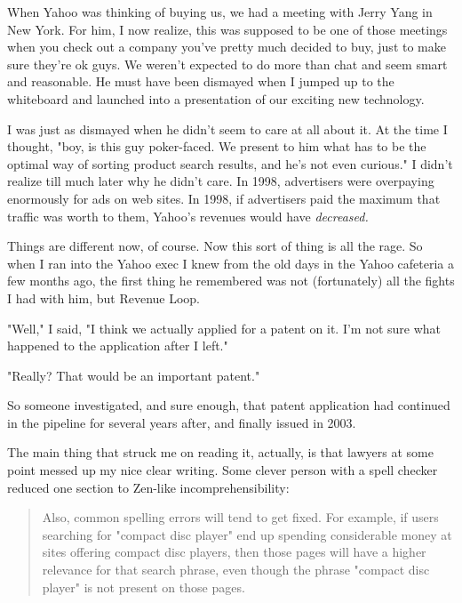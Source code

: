 When
                  Yahoo was thinking of buying us, we had a meeting with Jerry
                  Yang in New York. For him, I now realize, this was supposed to
                  be one of those meetings when you check out a company you've
                  pretty much decided to buy, just to make sure they're ok guys.
                  We weren't expected to do more than chat and seem smart and
                  reasonable. He must have been dismayed when I jumped up to the
                  whiteboard and launched into a presentation of our exciting
                  new technology.

I was just as dismayed when he
                  didn't seem to care at all about it. At the time I thought,
                  "boy, is this guy poker-faced. We present to him what has to
                  be the optimal way of sorting product search results, and he's
                  not even curious." I didn't realize till much later why he
                  didn't care. In 1998, advertisers were overpaying enormously
                  for ads on web sites. In 1998, if advertisers paid the maximum
                  that traffic was worth to them, Yahoo's revenues would have
                  \emph{decreased.}

Things are different now, of
                  course. Now this sort of thing is all the rage. So when I ran
                  into the Yahoo exec I knew from the old days in the Yahoo
                  cafeteria a few months ago, the first thing he remembered was
                  not (fortunately) all the fights I had with him, but Revenue
                  Loop.

"Well," I said, "I think we actually applied
                  for a patent on it. I'm not sure what happened to the
                  application after I left."

"Really? That would be
                  an important patent."

So someone investigated, and
                  sure enough, that patent application had continued in the
                  pipeline for several years after, and finally issued in
                  2003.

The main thing that struck me on reading it,
                  actually, is that lawyers at some point messed up my nice
                  clear writing. Some clever person with a spell checker reduced
                  one section to Zen-like incomprehensibility:
                  \begin{quote}

                    Also, common spelling errors will tend to get fixed. For
                    example, if users searching for "compact disc player" end up
                    spending considerable money at sites offering compact disc
                    players, then those pages will have a higher relevance for
                    that search phrase, even though the phrase "compact disc
                    player" is not present on those pages.
                  
\end{quote}

